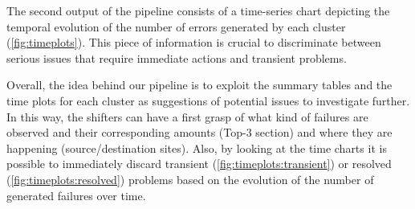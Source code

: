 The second output of the pipeline consists of a time-series chart depicting the temporal evolution of the number of errors generated by each cluster
(\cref{fig:timeplots}).
This piece of information is crucial to discriminate between serious issues that require immediate actions and transient problems. 

Overall, the idea behind our pipeline is to exploit the summary tables and the time plots for each cluster as suggestions of potential issues to investigate further.
In this way, the shifters can have a first grasp of what kind of failures are observed and their corresponding amounts (Top-3 section) and where they are happening (source/destination sites).
Also, by looking at the time charts it is possible to immediately discard transient (\cref{fig:timeplots:transient}) or resolved (\cref{fig:timeplots:resolved}) problems based on the evolution of the number of generated failures over time.



